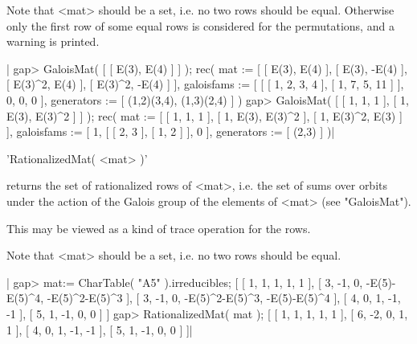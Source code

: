 Note  that <mat> should be a set,  i.e. no  two rows should be  equal.
Otherwise only the first row of some equal rows is  considered for the
permutations, and a warning is printed.

|    gap> GaloisMat( [ [ E(3), E(4) ] ] );
    rec(
      mat := [ [ E(3), E(4) ], [ E(3), -E(4) ], [ E(3)^2, E(4) ], 
          [ E(3)^2, -E(4) ] ],
      galoisfams := [ [ [ 1, 2, 3, 4 ], [ 1, 7, 5, 11 ] ], 0, 0, 0 ],
      generators := [ (1,2)(3,4), (1,3)(2,4) ] )
    gap> GaloisMat( [ [ 1, 1, 1 ], [ 1, E(3), E(3)^2 ] ] );
    rec(
      mat := [ [ 1, 1, 1 ], [ 1, E(3), E(3)^2 ], [ 1, E(3)^2, E(3) ] ],
      galoisfams := [ 1, [ [ 2, 3 ], [ 1, 2 ] ], 0 ],
      generators := [ (2,3) ] )|


'RationalizedMat( <mat> )'

returns the set  of rationalized rows of <mat>, i.e. the  set  of sums
over  orbits under the action  of the Galois  group of the elements of
<mat> (see "GaloisMat").

This may be viewed as a kind of trace operation for the rows.

Note that <mat> should be a set, i.e. no two rows should be equal.

|    gap> mat:= CharTable( "A5" ).irreducibles;
    [ [ 1, 1, 1, 1, 1 ], [ 3, -1, 0, -E(5)-E(5)^4, -E(5)^2-E(5)^3 ], 
      [ 3, -1, 0, -E(5)^2-E(5)^3, -E(5)-E(5)^4 ], [ 4, 0, 1, -1, -1 ], 
      [ 5, 1, -1, 0, 0 ] ]
    gap> RationalizedMat( mat );
    [ [ 1, 1, 1, 1, 1 ], [ 6, -2, 0, 1, 1 ], [ 4, 0, 1, -1, -1 ], 
      [ 5, 1, -1, 0, 0 ] ]|

